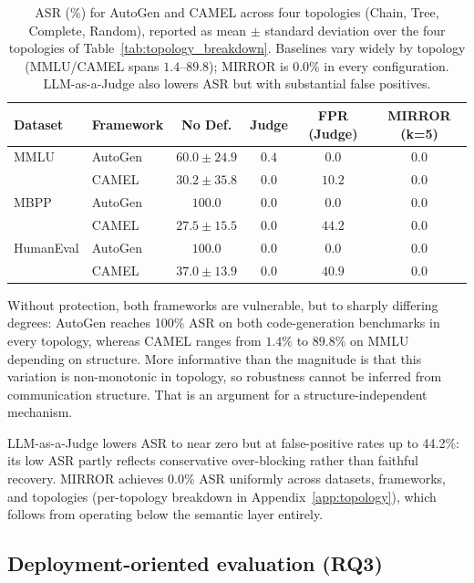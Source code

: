 \documentclass{article}
\begin{document}
\begin{table}[htbp]
\centering
\small
\setlength{\tabcolsep}{5pt}
\renewcommand{\arraystretch}{1.05}
\begin{tabular}{l l c c c c}
\toprule
\textbf{Dataset} & \textbf{Framework} & \textbf{No Def.} & \textbf{Judge} & \textbf{FPR (Judge)} & \textbf{MIRROR (k=5)} \\
\midrule
MMLU        & AutoGen & $60.0 \pm 24.9$ & $0.4$ & $0.0$ & $\mathbf{0.0}$ \\
            & CAMEL   & $30.2 \pm 35.8$ & $0.0$ & $10.2$ & $\mathbf{0.0}$ \\
\midrule
MBPP        & AutoGen & $100.0$         & $0.0$ & $0.0$ & $\mathbf{0.0}$ \\
            & CAMEL   & $27.5 \pm 15.5$ & $0.0$ & $44.2$ & $\mathbf{0.0}$ \\
\midrule
HumanEval   & AutoGen & $100.0$         & $0.0$ & $0.0$ & $\mathbf{0.0}$ \\
            & CAMEL   & $37.0 \pm 13.9$ & $0.0$ & $40.9$ & $\mathbf{0.0}$ \\
\bottomrule
\end{tabular}
\caption{ASR (\%) for AutoGen and CAMEL across four topologies (Chain, Tree, Complete, Random), reported as mean $\pm$ standard deviation over the four topologies of Table~\ref{tab:topology_breakdown}. Baselines vary widely by topology (MMLU/CAMEL spans $1.4$--$89.8$); MIRROR is 0.0\% in every configuration. LLM-as-a-Judge also lowers ASR but with substantial false positives.}
\label{tab:main_results}
\end{table}

Without protection, both frameworks are vulnerable, but to sharply differing degrees: AutoGen reaches 100\% ASR on both code-generation benchmarks in every topology, whereas CAMEL ranges from $1.4\%$ to $89.8\%$ on MMLU depending on structure. More informative than the magnitude is that this variation is non-monotonic in topology, so robustness cannot be inferred from communication structure. That is an argument for a structure-independent mechanism.

LLM-as-a-Judge lowers ASR to near zero but at false-positive rates up to 44.2\%: its low ASR partly reflects conservative over-blocking rather than faithful recovery. MIRROR achieves 0.0\% ASR uniformly across datasets, frameworks, and topologies (per-topology breakdown in Appendix~\ref{app:topology}), which follows from operating below the semantic layer entirely.

\subsection{Deployment-oriented evaluation (RQ3)}
\end{document}
